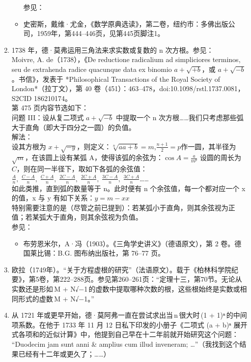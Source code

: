 \begin{enumerate}
\begin{itemize}
参见：
\item 史密斯，戴维·尤金，《数学原典选读》，第二卷，纽约市：多佛出版公司，1959年，第444–446页，见第445页脚注1。
\end{itemize}
\item 1738 年，德·莫弗运用三角法来求实数或复数的 n 次方根。参见：\\
Moivre, A. de（1738），《De reductione radicalium ad simpliciores terminos, seu de extrahenda radice quacunque data ex binomio $a + \sqrt{+b}$，或 $a + \sqrt{-b}$。书信》，发表于 *Philosophical Transactions of the Royal Society of London*（拉丁文），第 40 卷（451）：463–478，doi:10.1098/rstl.1737.0081，S2CID 186210174。\\
第 475 页内容节选如下：\\
问题 III：设从复二项式 $a + \sqrt{-b}$ 中提取一个 n 次方根……我们只考虑那些弧大于直角（即大于四分之一圆）的负值。\\
解法：\\
设其方根为 $x + \sqrt{-y}$，则定义：$\sqrt[n]{aa + b} = m$,$\frac{n + 1}{2} = p$作一圆，其半径为 $\sqrt{m}$，在该圆上设有某弧 A，使得该弧的余弦为：$\cos A = \frac{a}{m^p}$
设圆的周长为 $C$，则在同一半径下，取如下各弧的余弦值：$\frac{A}{n},\; \frac{C - A}{n},\; \frac{C + A}{n},\; \frac{2C - A}{n},\; \frac{2C + A}{n},\; \frac{3C - A}{n},\; \frac{3C + A}{n}$……\\
如此类推，直到弧的数量等于 n。此时便有 n 个余弦值，每一个都对应一个 x 的值，x 与 y 有如下关系：$y = m - xx$\\
特别需要注意的是（尽管之前已提到）：若某弧小于直角，则其余弦视为正值；若某弧大于直角，则其余弦视为负值。\\
参见：
\begin{itemize}
\item 布劳恩米尔，A·冯（1903）。《三角学史讲义》（德语原文），第 2 卷。德国莱比锡：B.G. 图布纳出版社，第 76–77 页。
\end{itemize}
\item 欧拉（1749年）。“关于方程虚根的研究”（法语原文）。载于《柏林科学院纪要》，第5卷，第222–288页。参见第260–261页：“定理十三，第70节。无论从实数还是形如 M + N√−1 的虚数中提取哪种次数的根，这些根始终是实数或相同形式的虚数 M + N√−1。”
\item 从 1721 年或更早开始，德·莫阿弗一直在尝试求出当 n 很大时 (1 + 1)ⁿ 的中间项系数。在他于 1733 年 11 月 12 日私下印发的小册子《二项式 (a + b)ⁿ 展开式各项和的近似计算》中，他提到自己早在十二年前就开始研究这个问题：\\
“Duodecim jam sunt anni & amplius cum illud inveneram; …”（我找到这个结果已经有十二年或更久了；……）

\end{enumerate}
